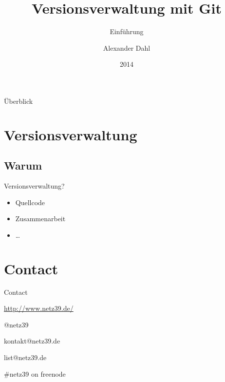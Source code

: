 \documentclass{beamer}
\title{Versionsverwaltung mit Git}
\subtitle{Einführung}
\author{Alexander Dahl}
\institute{Netz39 e.\,V.}
\date{2014}
\begin{document}
\begin{frame}
	\titlepage
\end{frame}

\logo{
    
}

\begin{frame}{Überblick}
    \tableofcontents
\end{frame}

\section{Versionsverwaltung}

\subsection{Warum}


\begin{frame}{Versionsverwaltung?}
    \begin{itemize}
        \item Quellcode
        \item Zusammenarbeit
        \item …
    \end{itemize}
\end{frame}

\section{Contact}

\begin{frame}{Contact}
    \begin{center}
        \begin{description}
            \item[WWW] \url{http://www.netz39.de/}
            \item[Twitter/identi.ca] @netz39
            \item[E-Mail] kontakt@netz39.de
            \item[Mailingliste] list@netz39.de
            \item[IRC] \#netz39 on freenode
        \end{description}
    \end{center}
\end{frame}
\end{document}
